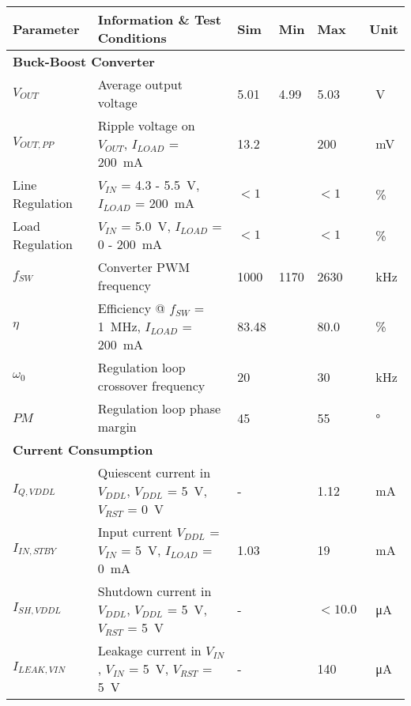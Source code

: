 \begin{table}[h!]
    \begin{tabular}{|l|l|l|l|l|l|}
    \hline
    \rowcolor{lightgray}
    \textbf{Parameter} & \textbf{Information \& Test Conditions} & \textbf{Sim} & \textbf{Min} & \textbf{Max} & \textbf{Unit} \\ \hline
    \multicolumn{6}{|l|}{\textbf{Buck-Boost Converter}} \\ \hline
    $V_{OUT}$  & Average output voltage & 5.01  & 4.99  &  5.03 &   \qty{}{\volt}  \\ \hline
    $V_{OUT,PP}$   & Ripple voltage on  $V_{OUT}$, $I_{LOAD}$  = \qty{200}{\milli\ampere} &  13.2 &  &  200 &  \qty{}{\milli\volt} \\ \hline
    Line Regulation  & $V_{IN}$ = 4.3 - \qty{5.5}{\volt}, $I_{LOAD}$ = \qty{200}{\milli\ampere} &  $<1$ &   &   $<1$ &  \qty{}{\percent}  \\ \hline
    Load Regulation  & $V_{IN}$ = \qty{5.0}{\volt}, $I_{LOAD}$ = 0 - \qty{200}{\milli\ampere} &   $<1$ &   &   $<1$ &\qty{}{\percent} \\ \hline
    $f_{SW}$  & Converter PWM frequency  &   1000  & 1170 & 2630   & \qty{}{\kilo\hertz}\\ \hline
    $\eta$  & Efficiency @  $f_{SW}$ = \qty{1}{\mega\hertz}, $I_{LOAD}$ = \qty{200}{\milli\ampere}&   83.48  &  & 80.0   & \qty{}{\percent}\\ \hline
    $\omega_{0}$ & Regulation loop crossover frequency&   20 &   &  30   & \qty{}{\kilo\hertz}\\ \hline 
    $PM$ & Regulation loop phase margin &   45 &   &  55   & \qty{}{\degree}\\ \hline 
    \multicolumn{6}{|l|}{ \textbf{Current Consumption}} \\ \hline
    $I_{Q,VDDL}$  & Quiescent current in $V_{DDL}$, $V_{DDL}$ = \qty{5}{\volt}, $V_{RST}$ = \qty{0}{\volt} &   -  &  & 1.12   & \qty{}{\milli\ampere} \\ \hline
    $I_{IN,STBY}$  & Input current $V_{DDL}$ = $V_{IN}$ = \qty{5}{\volt}, $I_{LOAD}$ = \qty{0}{\milli\ampere}  &  1.03   &  &  19   & \qty{}{\milli\ampere}\\ \hline
    $I_{SH,VDDL}$  & Shutdown current in $V_{DDL}$, $V_{DDL}$ = \qty{5}{\volt}, $V_{RST}$ = \qty{5}{\volt} &  -   &  &  $<10.0$    & \qty{}{\micro\ampere}\\ \hline
    $I_{LEAK,VIN}$  & Leakage current in $V_{IN}$, $V_{IN}$ = \qty{5}{\volt}, $V_{RST}$ = \qty{5}{\volt} &   -  &  &  140   & \qty{}{\micro\ampere}\\ \hline  

\end{tabular}
\end{table}
